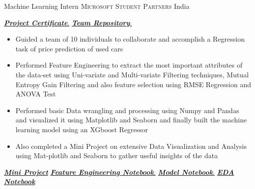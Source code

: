 \documentclass[11pt,a4paper,sans]{moderncv} %
\begin{document}
{Machine Learning Intern}
{\textsc{Microsoft Student Partners}}
{India}
{}
{
    \href{https://github.com/teetangh/Kaustav-All-Certifications/blob/master/Artificial\%20Intelligence/MSP\%20ML\%20Internship/internship\%20certificate.pdf}{ \textbf{\emph{Project Certificate}}.}
    \href{https://github.com/Microsoft-ML-Internship-Team/Major-Project-Submissions}{ \textbf{\emph{Team Repository}}.}
    \begin{itemize}
        \item {Guided a team of 10 individuals to collaborate and accomplish a Regression task of price prediction of used cars}
        \item {Performed Feature Engineering to extract the most important attributes of the data-set using Uni-variate and Multi-variate Filtering techniques, Mutual Entropy Gain Filtering and also feature selection using RMSE Regression and ANOVA Test}
        \item {Performed basic Data wrangling and processing using Numpy and Pandas and visualized it using Matplotlib and Seaborn and finally built the machine learning model using an XGboost Regressor}
        \item {Also completed a Mini Project on extensive Data Visualization and Analysis using Mat-plotlib and Seaborn to gather useful insights of the data}
    \end{itemize}
    \href{https://github.com/teetangh/Microsoft-Machine-Learning-Internship/blob/master/MINOR\%20PROJECT/Microsoft_Minor_Project_v2.ipynb}{\textbf{\emph{Mini Project}}}
    \href{https://github.com/Microsoft-ML-Internship-Team/Major-Project-Submissions/blob/master/KAUSTAV/02_Kaustav_feature_engineering_v4.ipynb}{\textbf{\emph{ Feature Engineering Notebook}}.}
    \href{https://github.com/Microsoft-ML-Internship-Team/Major-Project-Submissions/blob/master/KAUSTAV/03_Kaustav_Buidling_the_model_v1.ipynb}{\textbf{\emph{ Model Notebook}}.}
    \href{https://github.com/Microsoft-ML-Internship-Team/Major-Project-Submissions/blob/master/KAUSTAV/01_Kaustav_data_preprocess_EDA_v7.ipynb}{\textbf{\emph{ EDA Notebook}}}
}
\end{document}
